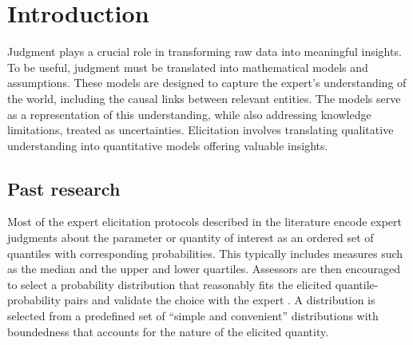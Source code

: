 \documentclass[
  fleqn,
  deca,
  blindrev
]{informs4}
\begin{document}
\maketitle

\section{Introduction}\label{introduction}

Judgment plays a crucial role in transforming raw data into meaningful
insights. To be useful, judgment must be translated into mathematical
models and assumptions. These models are designed to capture the
expert's understanding of the world, including the causal links between
relevant entities. The models serve as a representation of this
understanding, while also addressing knowledge limitations, treated as
uncertainties. Elicitation involves translating qualitative
understanding into quantitative models offering valuable insights.

\subsection*{Past research}\label{past-research}

Most of the expert elicitation protocols described in the literature
\citep{hanea2021ExpertJudgementRisk, gosling2018SHELFSheffieldElicitation, ohagan2006UncertainJudgementsEliciting, hemming2018PracticalGuideStructured, morgan2014UseAbuseExpert, welsh2018MoreorlessElicitationMOLE, spetzler1975ProbabilityEncodingDecision}
encode expert judgments about the parameter or quantity of interest as
an ordered set of quantiles with corresponding probabilities. This
typically includes measures such as the median and the upper and lower
quartiles. Assessors are then encouraged to select a probability
distribution that reasonably fits the elicited quantile-probability
pairs and validate the choice with the expert
\citep{gosling2018SHELFSheffieldElicitation}. A distribution is selected
from a predefined set of ``simple and convenient'' distributions
\citep{ohagan2006UncertainJudgementsEliciting} with boundedness that
accounts for the nature of the elicited quantity.
\end{document}
